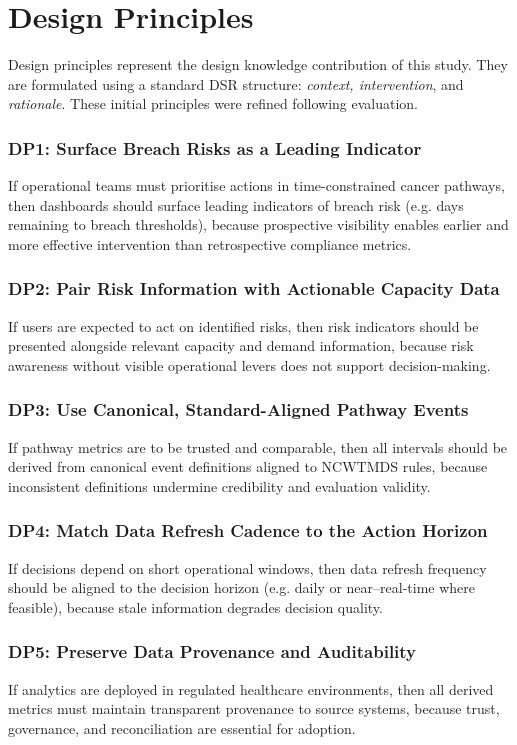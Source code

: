 \section{Design Principles} \label{DP}
Design principles represent the design knowledge contribution of this study. They are formulated using a standard DSR structure: \emph{context, intervention}, and \emph{rationale}. These initial principles were refined following evaluation.

\subsubsection*{DP1: Surface Breach Risks as a Leading Indicator}
If operational teams must prioritise actions in time-constrained cancer pathways, then dashboards should surface leading indicators of breach risk (e.g. days remaining to breach thresholds), because prospective visibility enables earlier and more effective intervention than retrospective compliance metrics. 

\subsubsection*{DP2: Pair Risk Information with Actionable Capacity Data}
If users are expected to act on identified risks, then risk indicators should be presented alongside relevant capacity and demand information, because risk awareness without visible operational levers does not support decision-making.

\subsubsection*{DP3: Use Canonical, Standard-Aligned Pathway Events}
If pathway metrics are to be trusted and comparable, then all intervals should be derived from canonical event definitions aligned to NCWTMDS rules, because inconsistent definitions undermine credibility and evaluation validity. 

\subsubsection*{DP4: Match Data Refresh Cadence to the Action Horizon}
If decisions depend on short operational windows, then data refresh frequency should be aligned to the decision horizon (e.g. daily or near–real-time where feasible), because stale information degrades decision quality.

\subsubsection*{DP5: Preserve Data Provenance and Auditability}
If analytics are deployed in regulated healthcare environments, then all derived metrics must maintain transparent provenance to source systems, because trust, governance, and reconciliation are essential for adoption.

